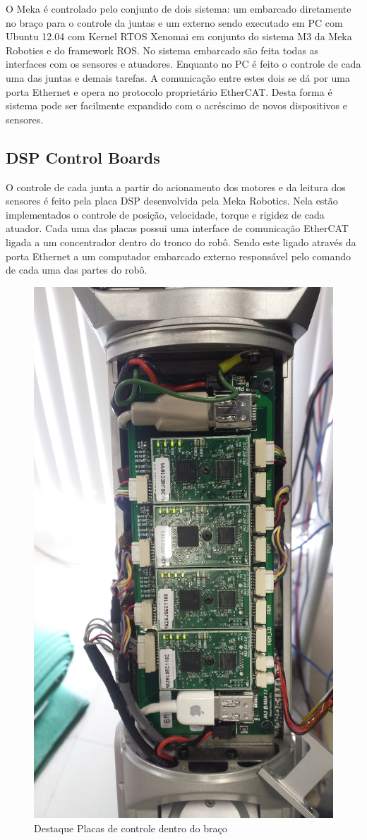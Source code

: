 O Meka é controlado pelo conjunto de dois sistema: um embarcado diretamente no braço para o controle da juntas e um externo sendo executado em PC com Ubuntu 12.04 com Kernel RTOS Xenomai em conjunto do sistema M3 da Meka Robotics e do framework ROS. No sistema embarcado são feita todas as interfaces com os sensores e atuadores. Enquanto no PC é feito o controle de cada uma das juntas e demais tarefas. A comunicação entre estes dois se dá por uma porta Ethernet e opera no protocolo proprietário EtherCAT. Desta forma é sistema pode ser facilmente expandido com o acréscimo de novos dispositivos e sensores.

\subsection{DSP Control Boards}
O controle de cada junta a partir do acionamento dos motores e da leitura dos sensores é feito pela placa DSP desenvolvida pela Meka Robotics. Nela estão implementados o controle de posição, velocidade, torque e rigidez de cada atuador. Cada uma das placas possui uma interface de comunicação EtherCAT ligada a um concentrador dentro do tronco do robô. Sendo este ligado através da porta Ethernet a um computador embarcado externo responsável pelo comando de cada uma das partes do robô.

\begin{figure}[H]
    \centering
    \includegraphics[width = 0.7\linewidth]{figs/dsp-control-wrist}
    \caption{Destaque Placas de controle dentro do braço \cite{nobody}}
    \label{fig:dsp-control-wrist}
\end{figure}

